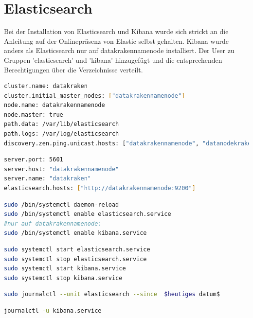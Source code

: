 \documentclass[12pt,oneside,a4paper,parskip]{scrbook}
\begin{document}
\pagebreak

\section{Elasticsearch}
Bei der Installation von Elasticsearch und Kibana wurde sich strickt an die Anleitung auf der Onlinepräsenz von Elastic selbst gehalten. Kibana wurde anders als Elasticsearch nur auf datakrakennamenode installiert.
Der User zu Gruppen 'elasticsearch' und 'kibana' hinzugefügt und die entsprechenden Berechtigungen über die Verzeichnisse verteilt.

\begin{lstlisting}[caption=elasticsearch.yml,label=elasticyml,language=bash]
cluster.name: datakraken
cluster.initial_master_nodes: ["datakrakennamenode"]
node.name: datakrakennamenode
node.master: true
path.data: /var/lib/elasticsearch
path.logs: /var/log/elasticsearch
discovery.zen.ping.unicast.hosts: ["datakrakennamenode", "datanodekraken1", "datanodekraken2"]
\end{lstlisting}

\begin{lstlisting}[caption=kibana.yml,label=kibanayml,language=bash]
server.port: 5601
server.host: "datakrakennamenode"
server.name: "datakraken"
elasticsearch.hosts: ["http://datakrakennamenode:9200"]
\end{lstlisting}


\begin{lstlisting}[caption=Setup zum automatischen Start mit jedem Boot, label=boot,language=bash]
sudo /bin/systemctl daemon-reload
sudo /bin/systemctl enable elasticsearch.service
#nur auf datakrakennamenode:
sudo /bin/systemctl enable kibana.service
\end{lstlisting}
\begin{lstlisting}[caption=Manuelles Starten/ Stoppen von Elasticsearch/Kibana,label=startstopelastic,language=bash]
sudo systemctl start elasticsearch.service
sudo systemctl stop elasticsearch.service
sudo systemctl start kibana.service
sudo systemctl stop kibana.service
\end{lstlisting}


\begin{lstlisting}[caption=Befehl zum durchsuchen der Logdaten,label=logelastic,language=bash]
sudo journalctl --unit elasticsearch --since  $heutiges datum$
\end{lstlisting}

\begin{lstlisting}[caption=Befehl zum durchsuchen der Logdaten,label=logkibana,language=bash]
journalctl -u kibana.service
\end{lstlisting}
\end{document}
